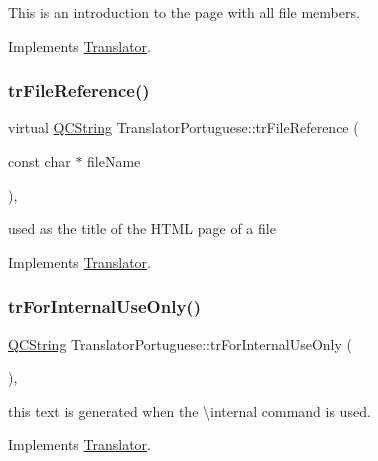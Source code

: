 This is an introduction to the page with all file members. 

Implements \mbox{\hyperlink{class_translator}{Translator}}.

\mbox{\label{class_translator_portuguese_a80cd24e5a18febdbfb0d7e1e6552665f}} 
\subsubsection{\texorpdfstring{trFileReference()}{trFileReference()}}
{\footnotesize\ttfamily virtual \mbox{\hyperlink{class_q_c_string}{Q\+C\+String}} Translator\+Portuguese\+::tr\+File\+Reference (\begin{DoxyParamCaption}\item[{const char $\ast$}]{file\+Name }\end{DoxyParamCaption})\hspace{0.3cm}{\ttfamily [inline]}, {\ttfamily [virtual]}}

used as the title of the H\+T\+ML page of a file 

Implements \mbox{\hyperlink{class_translator}{Translator}}.

\mbox{\label{class_translator_portuguese_a27fad9077f707adbed8f5a00060e3492}} 
\subsubsection{\texorpdfstring{trForInternalUseOnly()}{trForInternalUseOnly()}}
{\footnotesize\ttfamily \mbox{\hyperlink{class_q_c_string}{Q\+C\+String}} Translator\+Portuguese\+::tr\+For\+Internal\+Use\+Only (\begin{DoxyParamCaption}{ }\end{DoxyParamCaption})\hspace{0.3cm}{\ttfamily [inline]}, {\ttfamily [virtual]}}

this text is generated when the \textbackslash{}internal command is used. 

Implements \mbox{\hyperlink{class_translator}{Translator}}.

